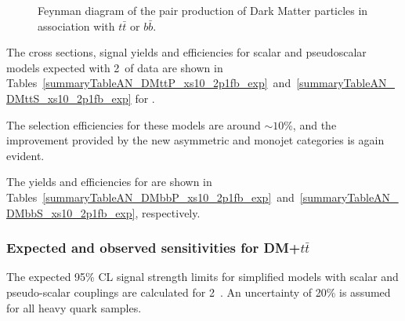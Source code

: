 \begin{figure}[h!] \centering
{}
\caption{Feynman diagram of the pair production of Dark Matter particles in
association with $t\bar{t}$ or $b\bar{b}$. \cite{Abercrombie:2015wmb}}
\label{fig:feynman_hf} \end{figure}


The cross sections, signal yields and efficiencies for scalar and pseudoscalar
\DMtt models expected with 2~\ifb of data are shown in 
Tables~\ref{summaryTableAN_DMttP_xs10_2p1fb_exp}~and~\ref{summaryTableAN_DMttS_xs10_2p1fb_exp} for \DMtt. 

The selection efficiencies for these models are around $\sim 10$\%, and the improvement
provided by the new asymmetric and monojet categories is again evident.

\clearpage 

 
\clearpage


The yields and efficiencies for \DMbb are shown in Tables~\ref{summaryTableAN_DMbbP_xs10_2p1fb_exp}~and~\ref{summaryTableAN_DMbbS_xs10_2p1fb_exp}, respectively. 

 
\clearpage


\subsubsection{Expected and observed sensitivities for DM+$t\bar{t}$}

The expected 95\% CL signal strength limits for simplified \DMtt models with scalar and
pseudo-scalar couplings are calculated for 2~\ifb. An uncertainty of 20\% is assumed for all 
heavy quark samples.



